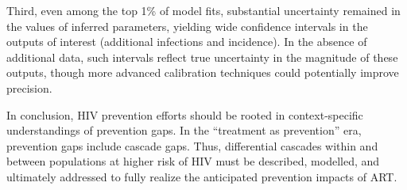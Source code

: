 Third, even among the top 1\% of model fits,
substantial uncertainty remained in the values of inferred parameters,
yielding wide confidence intervals in the outputs of interest (additional infections and incidence).
In the absence of additional data,
such intervals reflect true uncertainty in the magnitude of these outputs,
though more advanced calibration techniques could potentially improve precision.
\par
In conclusion, HIV prevention efforts should be rooted in
context-specific understandings of prevention gaps.
In the ``treatment as prevention'' era, prevention gaps include cascade gaps.
Thus, differential cascades within and between populations at higher risk of HIV
must be described, modelled, and ultimately addressed
to fully realize the anticipated prevention impacts of ART.
